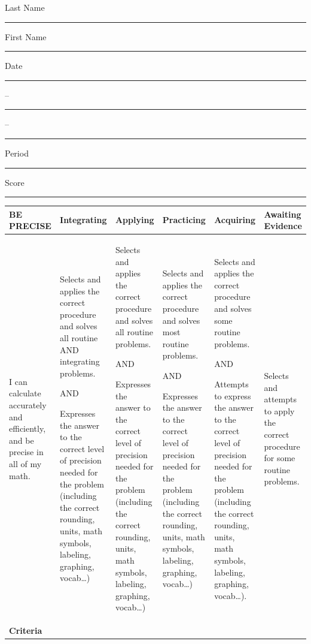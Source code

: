 \documentclass[10pt]{article}
\title{}
\date{}
\begin{document}
\noindent
{\large
Last Name \rule{6em}{.1pt}First Name \rule{6em}{.1pt} Date \rule{1.5em}{.1pt} -- \rule{1.5em}{.1pt} -- \rule{1.5em}{.1pt} Period \rule{2em}{.1pt} Score \rule{2em}{.1pt}
}
\vspace{1em}

\begingroup
\renewcommand{\arraystretch}{1.5}
\begin{center}
\tiny
{
\begin{tabularx}{\textwidth}{|X|X|X|X|X|X|}
\hline
\bf BE PRECISE & \centerline{Integrating} & \centerline{Applying} & \centerline{Practicing} & \centerline{Acquiring} & \centerline{Awaiting Evidence} \\
\hline
I can calculate accurately and efficiently, and be precise in all of my math.&
Selects and applies the correct procedure and solves all routine AND integrating problems.

AND

Expresses the answer to the correct level of precision needed for the problem (including the correct rounding, units, math symbols, labeling, graphing, vocab…)
&Selects and applies the correct procedure and solves all routine problems.


AND

Expresses the answer to the correct level of precision needed for the problem (including the correct rounding, units, math symbols, labeling, graphing, vocab…)
&Selects and applies the correct procedure and solves most routine problems.


AND

Expresses the answer to the correct level of precision needed for the problem (including the correct rounding, units, math symbols, labeling, graphing, vocab…)
&Selects and applies the correct procedure and solves some routine problems.


AND

Attempts to express the answer to the correct level of precision needed for the problem (including the correct rounding, units, math symbols, labeling, graphing, vocab…).
&Selects and attempts to apply the correct procedure for some routine problems.\\
\hline
\bf Criteria&\multicolumn{5}{l|}{\parbox[c][4em]{.8\textwidth}{}}\\
\hline
\end{tabularx}
}
\end{center}
\endgroup
\vspace{1em}
\end{document}
